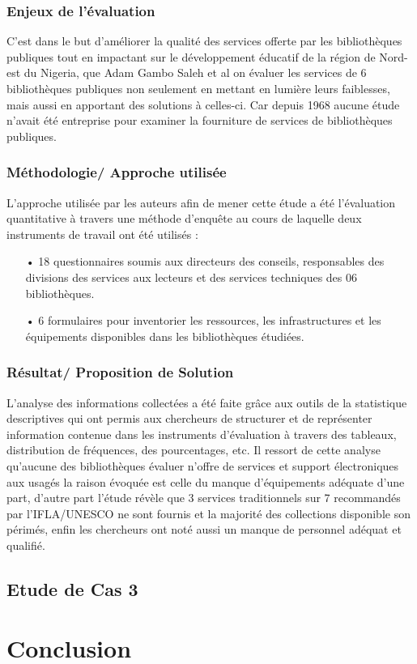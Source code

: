 \documentclass[french,a4paper,12pt]{article}
\begin{document}
\subsubsection{Enjeux de l’évaluation}
\quad C’est dans le but d’améliorer la qualité des services offerte par les bibliothèques publiques tout en impactant sur le développement éducatif de la région de Nord-est du Nigeria, que Adam Gambo Saleh et al on évaluer les services de 6 bibliothèques publiques non seulement en mettant en lumière leurs faiblesses, mais aussi en apportant des solutions à celles-ci. Car depuis 1968 aucune étude n'avait été entreprise pour examiner la fourniture de services de bibliothèques publiques. \\

\subsubsection{Méthodologie/ Approche utilisée}
\quad L’approche utilisée par les auteurs afin de mener cette étude a été l’évaluation quantitative à travers une méthode d’enquête au cours de laquelle deux instruments de travail ont été utilisés : 
\begin{enumerate}
\item[•]18 questionnaires soumis aux directeurs des conseils, responsables des divisions des services aux lecteurs et des services techniques des 06 bibliothèques.
\item[•]6 formulaires pour inventorier les ressources, les infrastructures et les équipements disponibles dans les bibliothèques étudiées.
\end{enumerate}

\subsubsection{Résultat/ Proposition de Solution}
\quad L’analyse des informations collectées a été faite grâce aux outils de la statistique descriptives qui ont permis aux chercheurs de structurer et de représenter information contenue dans les instruments d’évaluation à travers des tableaux, distribution de fréquences, des pourcentages, etc.
Il ressort de cette analyse qu’aucune des bibliothèques évaluer n’offre de services et support électroniques aux usagés la raison évoquée est celle du manque d’équipements adéquate d’une part, d’autre part l’étude révèle que 3 services traditionnels sur 7 recommandés par l’IFLA/UNESCO ne sont fournis et la majorité des collections disponible son périmés, enfin les chercheurs ont noté aussi un manque de personnel adéquat et qualifié.\\


\newpage
\subsection{Etude de Cas 3}

\newpage
\section{Conclusion}






\newpage
\begin{center}
\listoffigures
\end{center}

\newpage

\begin{center}

 
\end{center}
\end{document}
